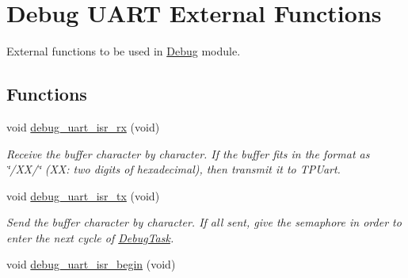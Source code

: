 \hypertarget{group___debug___u_a_r_t___external___functions}{}\section{Debug U\+A\+RT External Functions}
\label{group___debug___u_a_r_t___external___functions}


External functions to be used in \hyperlink{group___debug}{Debug} module.  


\subsection*{Functions}
\begin{DoxyCompactItemize}
\item 
void \hyperlink{group___debug___u_a_r_t___external___functions_ga2e1878be0250daf30f0a286af6e683e9}{debug\+\_\+uart\+\_\+isr\+\_\+rx} (void)\hypertarget{group___debug___u_a_r_t___external___functions_ga2e1878be0250daf30f0a286af6e683e9}{}\label{group___debug___u_a_r_t___external___functions_ga2e1878be0250daf30f0a286af6e683e9}

\begin{DoxyCompactList}\small\item\em Receive the buffer character by character. If the buffer fits in the format as \char`\"{}/\+X\+X/\char`\"{} (XX\+: two digits of hexadecimal), then transmit it to T\+P\+Uart. \end{DoxyCompactList}\item 
void \hyperlink{group___debug___u_a_r_t___external___functions_gaee765dd75f3414ade869071798ff33f4}{debug\+\_\+uart\+\_\+isr\+\_\+tx} (void)\hypertarget{group___debug___u_a_r_t___external___functions_gaee765dd75f3414ade869071798ff33f4}{}\label{group___debug___u_a_r_t___external___functions_gaee765dd75f3414ade869071798ff33f4}

\begin{DoxyCompactList}\small\item\em Send the buffer character by character. If all sent, give the semaphore in order to enter the next cycle of \hyperlink{group___debug___exported___functions___group2_ga0e7fca846e34e06a1f62249fe8a30a44}{Debug\+Task}. \end{DoxyCompactList}\item 
void \hyperlink{group___debug___u_a_r_t___external___functions_ga9d19c0e57b2d37c01bd781338322f682}{debug\+\_\+uart\+\_\+isr\+\_\+begin} (void)\hypertarget{group___debug___u_a_r_t___external___functions_ga9d19c0e57b2d37c01bd781338322f682}{}\label{group___debug___u_a_r_t___external___functions_ga9d19c0e57b2d37c01bd781338322f682}


\end{DoxyCompactItemize}
